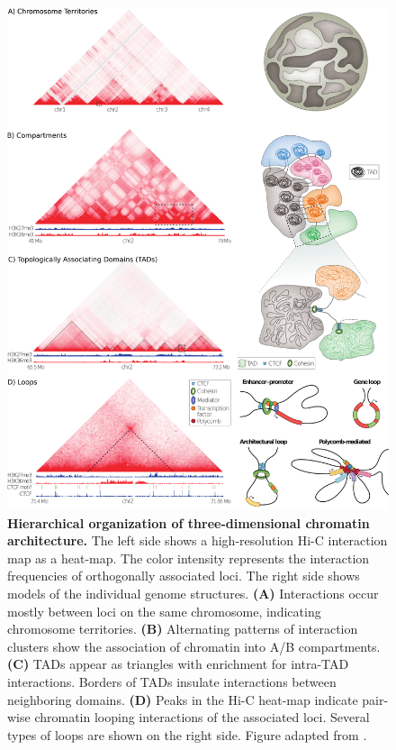 \documentclass[a4paper,twoside=true,openright,parskip=full,chapterprefix=true,11pt,headings=normal,bibliography=totoc,listof=totoc,titlepage=on,captions=tableabove,draft=false]{scrreprt}
\theoremstyle{definition}
\theoremstyle{definition}
\theoremstyle{definition}
\theoremstyle{remark}
\begin{document}
\begin{figure}

{\centering \includegraphics[width=1\linewidth]{figures/Bonev2016Fig2_reordered_v02} 

}

\caption{\textbf{Hierarchical organization of
three-dimensional chromatin architecture.} The left side shows a
high-resolution Hi-C interaction map as a heat-map. The color intensity
represents the interaction frequencies of orthogonally associated loci.
The right side shows models of the individual genome structures.
\textbf{(A)} Interactions occur mostly between loci on the same
chromosome, indicating chromosome territories. \textbf{(B)} Alternating
patterns of interaction clusters show the association of chromatin into
A/B compartments. \textbf{(C)} TADs appear as triangles with enrichment
for intra-TAD interactions. Borders of TADs insulate interactions
between neighboring domains. \textbf{(D)} Peaks in the Hi-C heat-map
indicate pair-wise chromatin looping interactions of the associated
loci. Several types of loops are shown on the right side. Figure adapted
from \citep{Bonev2016}.}\label{fig:GenomeHierarchy}
\end{figure}
\end{document}
